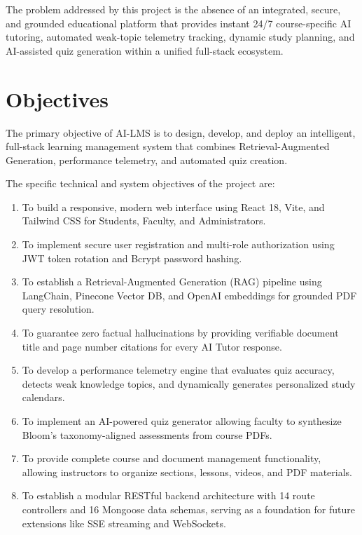 The problem addressed by this project is the absence of an integrated, secure, and grounded educational platform that provides instant 24/7 course-specific AI tutoring, automated weak-topic telemetry tracking, dynamic study planning, and AI-assisted quiz generation within a unified full-stack ecosystem.

\section{Objectives}

The primary objective of AI-LMS is to design, develop, and deploy an intelligent, full-stack learning management system that combines Retrieval-Augmented Generation, performance telemetry, and automated quiz creation.

The specific technical and system objectives of the project are:

\begin{enumerate}
    \item To build a responsive, modern web interface using React 18, Vite, and Tailwind CSS for Students, Faculty, and Administrators.
    \item To implement secure user registration and multi-role authorization using JWT token rotation and Bcrypt password hashing.
    \item To establish a Retrieval-Augmented Generation (RAG) pipeline using LangChain, Pinecone Vector DB, and OpenAI embeddings for grounded PDF query resolution.
    \item To guarantee zero factual hallucinations by providing verifiable document title and page number citations for every AI Tutor response.
    \item To develop a performance telemetry engine that evaluates quiz accuracy, detects weak knowledge topics, and dynamically generates personalized study calendars.
    \item To implement an AI-powered quiz generator allowing faculty to synthesize Bloom's taxonomy-aligned assessments from course PDFs.
    \item To provide complete course and document management functionality, allowing instructors to organize sections, lessons, videos, and PDF materials.
    \item To establish a modular RESTful backend architecture with 14 route controllers and 16 Mongoose data schemas, serving as a foundation for future extensions like SSE streaming and WebSockets.
\end{enumerate}

